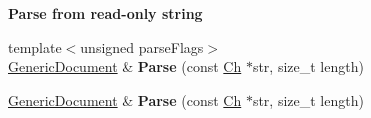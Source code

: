 \begin{Indent}{\bf Parse from read-\/only string}
\begin{DoxyCompactItemize}
\item 
{\footnotesize template$<$unsigned parse\+Flags$>$ }\\\hyperlink{class_generic_document}{Generic\+Document} \& {\bfseries Parse} (const \hyperlink{class_generic_value_ade0e0ce64ccd5d852da57a35e720bafb}{Ch} $\ast$str, size\+\_\+t length)\hypertarget{class_generic_document_a93fec16eacec4f4b42075bb3bc242a6b}{}\label{class_generic_document_a93fec16eacec4f4b42075bb3bc242a6b}

\item 
\hyperlink{class_generic_document}{Generic\+Document} \& {\bfseries Parse} (const \hyperlink{class_generic_value_ade0e0ce64ccd5d852da57a35e720bafb}{Ch} $\ast$str, size\+\_\+t length)\hypertarget{class_generic_document_ab13d8358acc0648e3f91f6b825365e4f}{}\label{class_generic_document_ab13d8358acc0648e3f91f6b825365e4f}

\end{DoxyCompactItemize}
\end{Indent}
